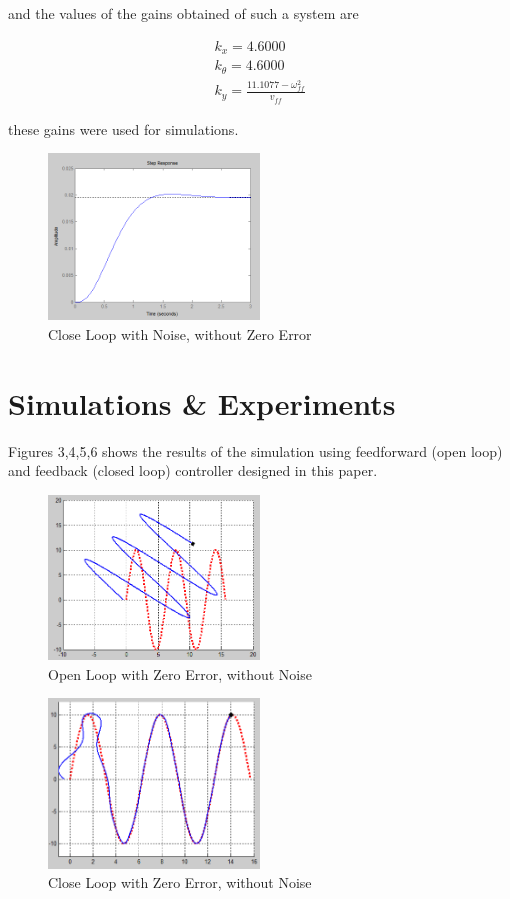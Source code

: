 \documentclass[conference]{IEEEtran}
\begin{document}
and the values of the gains obtained of such a system are

\begin{equation}\label{eq}
\begin{split}
k_{x} = 4.6000 \\
k_{\theta} = 4.6000 \\
k_{y} = \frac{11.1077-\omega_{ff}^2}{v_{ff}}
\end{split}
\end{equation}

these gains were used for simulations.
\begin{figure}[h!]
  \caption{Close Loop with Noise, without Zero Error}
  \centering
    \includegraphics[width=0.5\textwidth]{response}
\end{figure}
\section{Simulations \& Experiments}
Figures 3,4,5,6 shows the results of the simulation using feedforward (open loop) and feedback (closed loop) controller designed in this paper.
\begin{figure}[h!]
  \caption{Open Loop with Zero Error, without Noise}
  \centering
    \includegraphics[width=0.5\textwidth]{OpenZero}
\end{figure}

\begin{figure}[h!]
  \caption{Close Loop with Zero Error, without Noise}
  \centering
    \includegraphics[width=0.5\textwidth]{CloseZero}
\end{figure}
\end{document}
